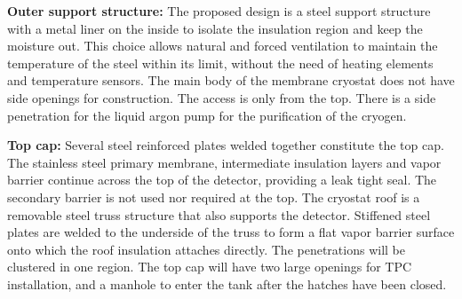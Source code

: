 

\textbf{Outer support structure:}
%
The proposed design is a steel support structure with a metal liner on the inside to isolate the insulation region and keep the moisture out. This choice allows natural and forced ventilation to maintain the temperature of the steel within its limit, without the need of heating elements and temperature sensors. 
The main body of the membrane cryostat does not have side openings for construction. The access is only from the top. There is a side penetration for the liquid argon pump for the purification of the cryogen.

%


\textbf{Top cap:}
%
Several steel reinforced plates welded together constitute the top cap. The stainless steel primary 
membrane, intermediate insulation layers and vapor barrier continue across the top of the detector, 
providing a leak tight seal. The secondary barrier is not used nor required at the top. The cryostat roof is 
a removable steel truss structure that also supports the detector. Stiffened steel plates are welded to the 
underside of the truss to form a flat vapor barrier surface onto which the roof insulation attaches directly. 
The penetrations will be clustered in one region. The top cap will have two large openings for TPC 
installation, and a manhole to enter the tank  after the 
hatches have been closed.

